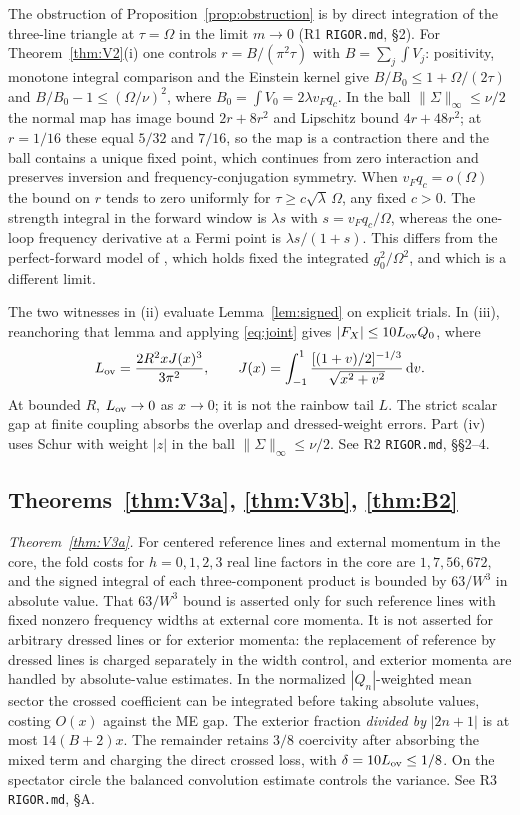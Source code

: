 \documentclass[11pt]{article}
\newcommand{\dd}{\,\mathrm d}
\theoremstyle{definition}
\theoremstyle{remark}
\begin{document}
The obstruction of Proposition~\ref{prop:obstruction} is by direct integration of the three-line triangle at $\tau=\Omega$ in the limit $m\to0$ (R1 \texttt{RIGOR.md}, \S2). For Theorem~\ref{thm:V2}(i) one controls $r=B/(\pi^2\tau)$ with $B=\sum_j\!\int V_j$: positivity, monotone integral comparison and the Einstein kernel give $B/B_0\le1+\Omega/(2\tau)$ and $B/B_0-1\le(\Omega/\nu)^2$, where $B_0=\int V_0=2\lambda v_Fq_c$. In the ball $\|\Sigma\|_\infty\le\nu/2$ the normal map has image bound $2r+8r^2$ and Lipschitz bound $4r+48r^2$; at $r=1/16$ these equal $5/32$ and $7/16$, so the map is a contraction there and the ball contains a unique fixed point, which continues from zero interaction and preserves inversion and frequency-conjugation symmetry. When $v_Fq_c=o(\Omega)$ the bound on $r$ tends to zero uniformly for $\tau\ge c\sqrt\lambda\,\Omega$, any fixed $c>0$. The strength integral in the forward window is $\lambda s$ with $s=v_Fq_c/\Omega$, whereas the one-loop frequency derivative at a Fermi point is $\lambda s/(1+s)$. This differs from the perfect-forward model of \cite{Rademaker}, which holds fixed the integrated $g_0^2/\Omega^2$, and which is a different limit.

The two witnesses in (ii) evaluate Lemma~\ref{lem:signed} on explicit trials. In (iii), reanchoring that lemma and applying \eqref{eq:joint} gives $|F_X|\le10L_{\rm ov}Q_0$, where
\[
L_{\rm ov}=\frac{2R^2 x J(x)^3}{3\pi^2},\qquad
J(x)=\int_{-1}^1 \frac{[(1+v)/2]^{-1/3}}{\sqrt{x^2+v^2}}\dd v.
\]
At bounded $R$, $L_{\rm ov}\to0$ as $x\to0$; it is not the rainbow tail $L$. The strict scalar gap at finite coupling absorbs the overlap and dressed-weight errors. Part (iv) uses Schur with weight $|z|$ in the ball $\|\Sigma\|_\infty\le\nu/2$. See R2 \texttt{RIGOR.md}, \S\S2--4.

\subsection{Theorems~\ref{thm:V3a}, \ref{thm:V3b}, \ref{thm:B2}}

\emph{Theorem~\ref{thm:V3a}.} For centered reference lines and external momentum in the core, the fold costs for $h=0,1,2,3$ real line factors in the core are $1,7,56,672$, and the signed integral of each three-component product is bounded by $63/W^3$ in absolute value. That $63/W^3$ bound is asserted only for such reference lines with fixed nonzero frequency widths at external core momenta. It is not asserted for arbitrary dressed lines or for exterior momenta: the replacement of reference by dressed lines is charged separately in the width control, and exterior momenta are handled by absolute-value estimates. In the normalized $|Q_n|$-weighted mean sector the crossed coefficient can be integrated before taking absolute values, costing $O(x)$ against the ME gap. The exterior fraction \emph{divided by} $|2n+1|$ is at most $14(B+2)x$. The remainder retains $3/8$ coercivity after absorbing the mixed term and charging the direct crossed loss, with $\delta=10L_{\rm ov}\le1/8$. On the spectator circle the balanced convolution estimate controls the variance. See R3 \texttt{RIGOR.md}, \S A.
\end{document}

